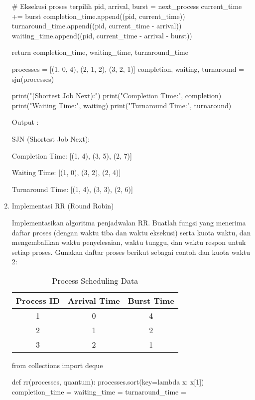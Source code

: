 \documentclass[12pt]{article}
\begin{document}
\begin{enumerate}
\begin{python}
        # Eksekusi proses terpilih
        pid, arrival, burst = next_process
        current_time += burst
        completion_time.append((pid, current_time))
        turnaround_time.append((pid, current_time - arrival))
        waiting_time.append((pid, current_time - arrival - burst))

    return completion_time, waiting_time, turnaround_time

processes = [(1, 0, 4), (2, 1, 2), (3, 2, 1)]
completion, waiting, turnaround = sjn(processes)

print("\nSJN (Shortest Job Next):")
print("Completion Time:", completion)
print("Waiting Time:", waiting)
print("Turnaround Time:", turnaround)
\end{python}
        Output : 
        \par SJN (Shortest Job Next):
        \par Completion Time: [(1, 4), (3, 5), (2, 7)]
        \par Waiting Time: [(1, 0), (3, 2), (2, 4)]
        \par Turnaround Time: [(1, 4), (3, 3), (2, 6)]
        
    \item Implementasi RR (Round Robin)
        \par  Implementasikan algoritma penjadwalan RR. Buatlah fungsi yang menerima daftar proses (dengan waktu tiba dan waktu eksekusi) serta kuota waktu, dan mengembalikan waktu penyelesaian, waktu tunggu, dan waktu respon untuk setiap proses. Gunakan daftar proses berikut sebagai contoh dan kuota waktu 2:
        \begin{table}[h!]
        \centering
        \begin{tabular}{|c|c|c|}
        \hline
        \textbf{Process ID} & \textbf{Arrival Time} & \textbf{Burst Time} \\ \hline
        1 & 0 & 4 \\ \hline
        2 & 1 & 2 \\ \hline
        3 & 2 & 1 \\ \hline
        \end{tabular}
        \caption{Process Scheduling Data}
        \end{table}
        
\begin{python}
from collections import deque

def rr(processes, quantum):
    processes.sort(key=lambda x: x[1]) 
    completion_time = {}
    waiting_time = {}
    turnaround_time = {}
    

\end{python}
\end{enumerate}
\end{document}
